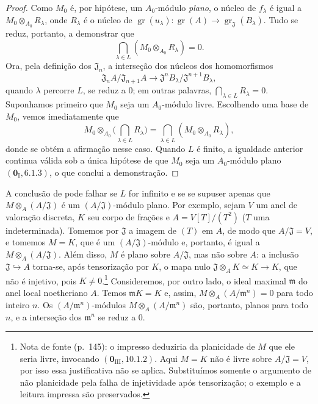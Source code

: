 \begin{proof}

Como $M_0$ é, por hipótese, um
$A_0$-módulo \emph{plano}, o núcleo
de $f_\lambda$ é igual a
$M_0\otimes_{A_0}R_\lambda$,
onde $R_\lambda$ é o núcleo de
$\operatorname{gr}(u_\lambda):
\operatorname{gr}(A)\to
\operatorname{gr}_{\mathfrak J}
(B_\lambda)$. Tudo se reduz,
portanto, a demonstrar que
\[
\bigcap_{\lambda\in L}
(M_0\otimes_{A_0}R_\lambda)=0.
\]
Ora, pela definição dos
$\mathfrak J_n$, a interseção dos
núcleos dos homomorfismos
\[
\mathfrak J_nA/\mathfrak J_{n+1}A
\longrightarrow
\mathfrak J^nB_\lambda/
\mathfrak J^{n+1}B_\lambda,
\]
quando $\lambda$ percorre $L$,
se reduz a $0$; em outras
palavras,
$\bigcap_{\lambda\in L}R_\lambda=0$.
Suponhamos primeiro que $M_0$
seja um $A_0$-módulo livre.
Escolhendo uma base de $M_0$,
vemos imediatamente que
\[
M_0\otimes_{A_0}
\Big(\bigcap_{\lambda\in L}R_\lambda\Big)
=\bigcap_{\lambda\in L}
(M_0\otimes_{A_0}R_\lambda),
\]
donde se obtém a afirmação
nesse caso. Quando $L$ é finito,
a igualdade anterior continua
válida sob a única hipótese de
que $M_0$ seja um $A_0$-módulo
plano $(\mathbf 0_{\mathrm I},6.1.3)$,
o que conclui a demonstração.
\end{proof}

\begin{remark}[11.4.2]
\label{IV.11.4.2}
A conclusão de 
pode falhar se $L$ for infinito
e se se supuser apenas que
$M\otimes_A(A/\mathfrak J)$ é um
$(A/\mathfrak J)$-módulo plano.
Por exemplo, sejam $V$ um anel
de valoração discreta, $K$ seu
corpo de frações e
$A=V[T]/(T^2)$ ($T$ uma
indeterminada). Tomemos por
$\mathfrak J$ a imagem de $(T)$
em $A$, de modo que
$A/\mathfrak J=V$, e tomemos
$M=K$, que é um
$(A/\mathfrak J)$-módulo e,
portanto, é igual a
$M\otimes_A(A/\mathfrak J)$.
Além disso, $M$ é plano sobre
$A/\mathfrak J$, mas não sobre
$A$: a inclusão
$\mathfrak J\hookrightarrow A$
torna-se, após tensorização por $K$,
o mapa nulo
$\mathfrak J\otimes_A K\simeq K\longrightarrow K$,
que não é injetivo, pois $K\neq0$.\footnote{Nota de fonte (p.~145): o impresso deduziria da planicidade de $M$ que ele seria livre, invocando $(\mathbf 0_{\mathrm{III}},10.1.2)$. Aqui $M=K$ não é livre sobre $A/\mathfrak J=V$, por isso essa justificativa não se aplica. Substituímos somente o argumento de não planicidade pela falha de injetividade após tensorização; o exemplo e a leitura impressa são preservados.}
Consideremos, por outro lado,
o ideal maximal $\mathfrak m$
do anel local noetheriano $A$.
Temos $\mathfrak mK=K$ e, assim,
$M\otimes_A(A/\mathfrak m^n)=0$
para todo inteiro $n$.
Os $(A/\mathfrak m^n)$-módulos
$M\otimes_A(A/\mathfrak m^n)$
são, portanto, planos para todo
$n$, e a interseção dos
$\mathfrak m^n$ se reduz a $0$.
\end{remark}

